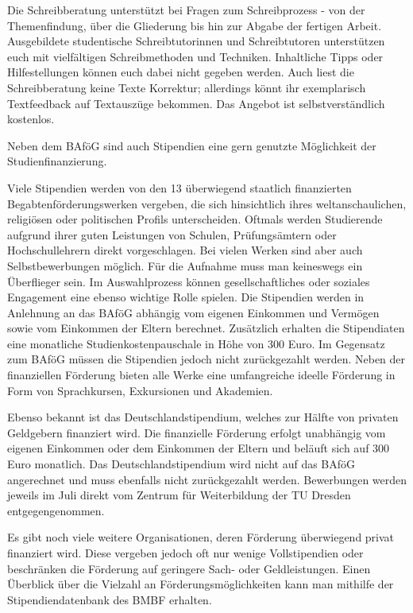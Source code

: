 Die Schreibberatung unterstützt bei Fragen zum Schreibprozess - von der Themenfindung, über die Gliederung bis hin zur Abgabe der fertigen Arbeit. 
Ausgebildete studentische Schreibtutorinnen und Schreibtutoren unterstützen euch mit vielfältigen Schreibmethoden und Techniken. 
Inhaltliche Tipps oder Hilfestellungen können euch dabei nicht gegeben werden.
Auch liest die Schreibberatung keine Texte Korrektur; allerdings könnt ihr exemplarisch Textfeedback auf Textauszüge bekommen.
Das Angebot ist selbstverständlich kostenlos.


Neben dem BAföG sind auch Stipendien eine gern genutzte Möglichkeit der Studienfinanzierung.

Viele Stipendien werden von den 13 überwiegend staatlich finanzierten Begabtenförderungswerken vergeben, die sich hinsichtlich ihres weltanschaulichen, religiösen oder politischen Profils unterscheiden.
Oftmals werden Studierende aufgrund ihrer guten Leistungen von Schulen, Prüfungsämtern oder Hochschullehrern direkt vorgeschlagen.
Bei vielen Werken sind aber auch Selbstbewerbungen möglich.
Für die Aufnahme muss man keineswegs ein Überflieger sein.
Im Auswahlprozess können gesellschaftliches oder soziales Engagement eine ebenso wichtige Rolle spielen.
Die Stipendien werden in Anlehnung an das BAföG abhängig vom eigenen Einkommen und Vermögen sowie vom Einkommen der Eltern berechnet.
Zusätzlich erhalten die Stipendiaten eine monatliche Studienkostenpauschale in Höhe von 300 Euro.
Im Gegensatz zum BAföG müssen die Stipendien jedoch nicht zurückgezahlt werden.
Neben der finanziellen Förderung bieten alle Werke eine umfangreiche ideelle Förderung in Form von Sprachkursen, Exkursionen und Akademien.

Ebenso bekannt ist das Deutschlandstipendium, welches zur Hälfte von privaten Geldgebern finanziert wird.
Die finanzielle Förderung erfolgt unabhängig vom eigenen Einkommen oder dem Einkommen der Eltern und beläuft sich auf 300 Euro monatlich.
Das Deutschlandstipendium wird nicht auf das BAföG angerechnet und muss ebenfalls nicht zurückgezahlt werden.
Bewerbungen werden jeweils im Juli direkt vom Zentrum für Weiterbildung der TU Dresden  entgegengenommen.

Es gibt noch viele weitere Organisationen, deren Förderung überwiegend privat finanziert wird. Diese vergeben jedoch oft nur wenige Vollstipendien oder beschränken die Förderung auf geringere Sach- oder Geldleistungen.
Einen Überblick über die Vielzahl an Förderungsmöglichkeiten kann man mithilfe der Stipendiendatenbank des BMBF  erhalten.



